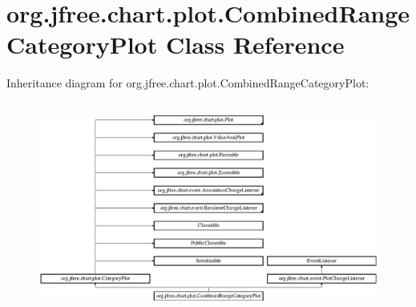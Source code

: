 \hypertarget{classorg_1_1jfree_1_1chart_1_1plot_1_1_combined_range_category_plot}{}\section{org.\+jfree.\+chart.\+plot.\+Combined\+Range\+Category\+Plot Class Reference}
\label{classorg_1_1jfree_1_1chart_1_1plot_1_1_combined_range_category_plot}
Inheritance diagram for org.\+jfree.\+chart.\+plot.\+Combined\+Range\+Category\+Plot\+:\begin{figure}[H]
\begin{center}
\leavevmode
\includegraphics[height=6.960452cm]{classorg_1_1jfree_1_1chart_1_1plot_1_1_combined_range_category_plot}
\end{center}
\end{figure}
